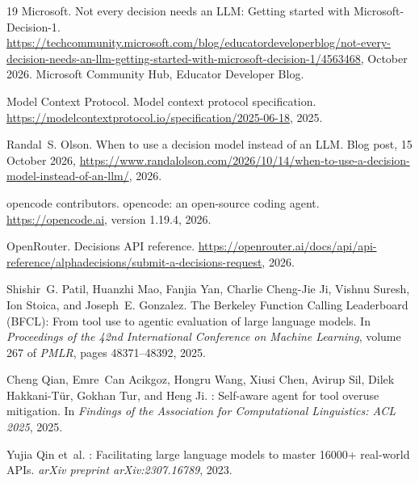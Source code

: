 \begin{thebibliography}{19}
{Microsoft}.
\newblock Not every decision needs an {LLM}: Getting started with
  {Microsoft-Decision-1}.
\newblock
  \url{https://techcommunity.microsoft.com/blog/educatordeveloperblog/not-every-decision-needs-an-llm-getting-started-with-microsoft-decision-1/4563468},
  October 2026.
\newblock Microsoft Community Hub, Educator Developer Blog.

{Model Context Protocol}.
\newblock Model context protocol specification.
\newblock \url{https://modelcontextprotocol.io/specification/2025-06-18}, 2025.

Randal~S. Olson.
\newblock When to use a decision model instead of an {LLM}.
\newblock Blog post, 15 October 2026,
  \url{https://www.randalolson.com/2026/10/14/when-to-use-a-decision-model-instead-of-an-llm/},
  2026.

{opencode contributors}.
\newblock opencode: an open-source coding agent.
\newblock \url{https://opencode.ai}, version 1.19.4, 2026.

{OpenRouter}.
\newblock Decisions {API} reference.
\newblock
  \url{https://openrouter.ai/docs/api/api-reference/alphadecisions/submit-a-decisions-request},
  2026.

Shishir~G. Patil, Huanzhi Mao, Fanjia Yan, Charlie Cheng-Jie Ji, Vishnu Suresh,
  Ion Stoica, and Joseph~E. Gonzalez.
\newblock The {Berkeley Function Calling Leaderboard} ({BFCL}): From tool use
  to agentic evaluation of large language models.
\newblock In \emph{Proceedings of the 42nd International Conference on Machine
  Learning}, volume 267 of \emph{PMLR}, pages 48371--48392, 2025.

Cheng Qian, Emre~Can Acikgoz, Hongru Wang, Xiusi Chen, Avirup Sil, Dilek
  Hakkani-T{\"u}r, Gokhan Tur, and Heng Ji.
: Self-aware agent for tool overuse mitigation.
\newblock In \emph{Findings of the Association for Computational Linguistics:
  ACL 2025}, 2025.

Yujia Qin et~al.
: Facilitating large language models to master 16000+
  real-world {APIs}.
\newblock \emph{arXiv preprint arXiv:2307.16789}, 2023.


\end{thebibliography}
